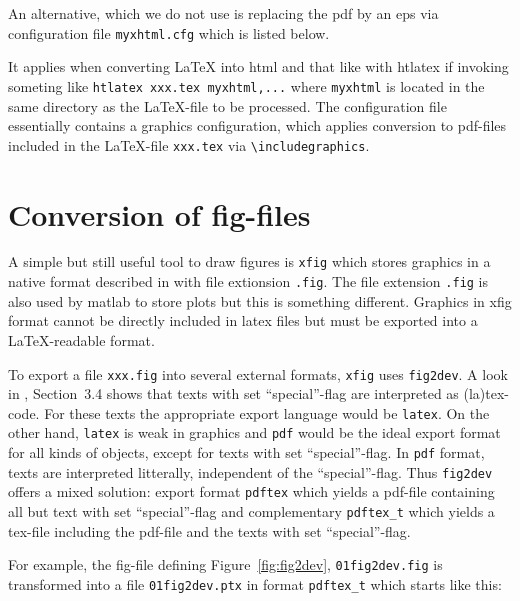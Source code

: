 \documentclass[12pt]{book}
\newcommand{\gls}[1]{#1}
\renewcommand{\index}[1]{ }
\begin{document}
An alternative, which we do not use 
is replacing the pdf by an \gls{eps} via configuration file \texttt{myxhtml.cfg} 
which is listed below. 
%
\lstset{language=tex, basicstyle=\scriptsize}

%
It applies when converting \LaTeX{} into html and that like 
with htlatex if invoking someting like \texttt{htlatex xxx.tex myxhtml,...} 
where \texttt{myxhtml} is located in the same directory as the \LaTeX-file 
to be processed. 
The configuration file essentially contains a graphics configuration, 
which applies conversion to pdf-files included in the \LaTeX-file \texttt{xxx.tex}
via \texttt{\textbackslash includegraphics}. 


\section{Conversion of fig-files}\label{sec:fig2dev}

\index{xfig}
\index{fig2dev}
A simple but still useful tool to draw figures is \texttt{xfig} 
which stores graphics in a native format 
described in \cite{XFigF} with file extionsion \texttt{.fig}. 
The file extension \texttt{.fig} is also used by matlab to store plots 
but this is something different. 
Graphics in xfig format cannot be directly included in latex files 
but must be exported into a \LaTeX-readable format. 

To export a file \texttt{xxx.fig} into several external formats, 
\texttt{xfig} uses \texttt{fig2dev}. 
A look in \cite{XFigF}, Section~3.4 shows that texts with set ``special''-flag 
are interpreted as (la)tex-code. 
For these texts the appropriate export language would be \texttt{latex}. 
On the other hand, \texttt{latex} is weak in graphics 
and \texttt{pdf} would be the ideal export format for all kinds of objects, 
except for texts with set ``special''-flag. 
In \texttt{pdf} format, texts are interpreted litterally, 
independent of the ``special''-flag. 
Thus \texttt{fig2dev} offers a mixed solution: 
export format \texttt{pdftex} which yields a pdf-file 
containing all but text with set ``special''-flag 
and complementary \texttt{pdftex\_t} which yields a tex-file 
including the pdf-file and the texts with set ``special''-flag. 
\index{special-flag}%

For example, the fig-file defining Figure~\ref{fig:fig2dev}, 
\texttt{01fig2dev.fig} is transformed into a file  \texttt{01fig2dev.ptx} 
in format \texttt{pdftex\_t} which starts like this: 
%
\lstset{language=tex, breaklines, basicstyle=\small}

\end{document}
